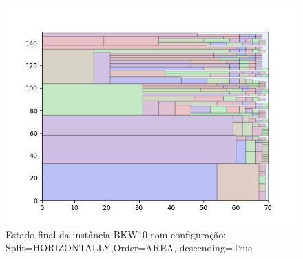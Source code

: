 \begin{figure}[H]
    \centering
    \caption[]{Estado final da instância BKW10 com configuração: Split=HORIZONTALLY,Order=AREA, descending=True}
    \label{fig:bkw10-horizontally-area-true}
    \includegraphics[scale=0.5]{output/figures/bkw/bkw10/horizontally/area/true/000}
\end{figure}